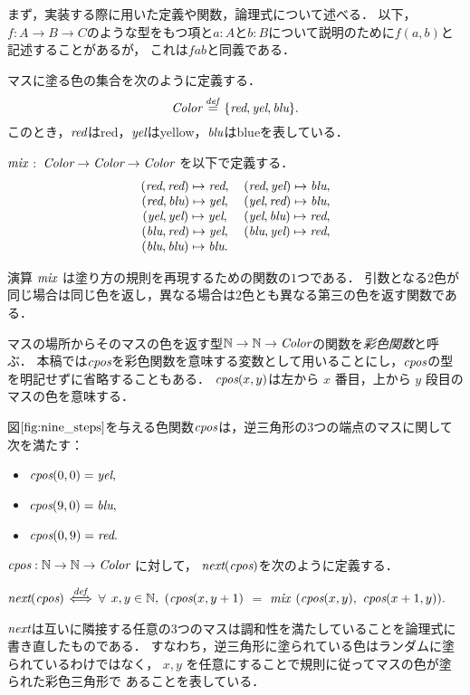 まず，実装する際に用いた定義や関数，論理式について述べる．
以下，$f:A\to B\to C$のような型をもつ項と$a:A$と$b:B$について説明のために$f(a,b)$と記述することがあるが，
これは$f a b$と同義である．
\begin{dfn}[$\Color$]\rm
  マスに塗る色の集合を次のように定義する．
  \[
  \textit{Color} \overset{{\it def}}{=} \{\textit{red}, \textit{yel}, \textit{blu}\}.
  \]
  このとき，$\textit{red}$は{\rm{red}}，$\textit{yel}$は{\rm{yellow}}，$\textit{blu}$は{\rm{blue}}を表している．
\end{dfn}
\begin{dfn}[$\mix$]\rm
  $\mix$ $:$ $\textit{Color} \to \textit{Color} \to \textit{Color}$ を以下で定義する．
  \[
  \begin{tabular}{cc}
    $(\red,\red) \Pto \red,$ & $(\red,\yel) \Pto \blu,$ \\
    $(\red,\blu) \Pto \yel,$ & $(\yel,\red) \Pto \blu,$ \\
    $(\yel,\yel) \Pto \yel,$ & $(\yel,\blu) \Pto \red,$ \\
    $(\blu,\red) \Pto \yel,$ & $(\blu,\yel) \Pto \red,$ \\
    $(\blu,\blu) \Pto \blu.$ \\
  \end{tabular}
  \]
\end{dfn}
演算 $\mix$ は塗り方の規則を再現するための関数の$1$つである．
引数となる$2$色が同じ場合は同じ色を返し，異なる場合は$2$色とも異なる第三の色を返す関数である．
\begin{dfn}[彩色関数]\rm
  マスの場所からそのマスの色を返す型$\mathbb{N} \to \mathbb{N} \to \textit{Color}$の関数を{\em 彩色関数}と呼ぶ．
  本稿では$\textit{cpos}$を彩色関数を意味する変数として用いることにし，$\textit{cpos}$の型を明記せずに省略することもある．
  $\textit{cpos}(x,y)$は左から $x$ 番目，上から $y$ 段目のマスの色を意味する．
\end{dfn}
\begin{exm}
  図$\ref{fig:nine_steps}$を与える色関数$\textit{cpos}$は，逆三角形の$3$つの端点のマスに関して
  次を満たす：
  \begin{itemize}
    \item $\textit{cpos}(0,0) = \textit{yel},$
    \item $\textit{cpos}(9,0) = \textit{blu},$
    \item $\textit{cpos}(0,9) = \textit{red}.$
  \end{itemize}
\end{exm}
\begin{dfn}[$\next$]\rm
  $\textit{cpos} : \mathbb{N} \to \mathbb{N} \to \textit{Color}$ に対して，
  $\textit{next}(\textit{cpos})$を次のように定義する．

  $\textit{next}(\textit{cpos})$ $\overset{{\it def}}{\Longleftrightarrow}$
  $\forall$ $x,y \in\mathbb{N},$
  $(\textit{cpos}(x,y+1)$ $=$ $\mix$ $(\textit{cpos}(x,y),$ $\textit{cpos}(x+1,y)).$
\end{dfn}
$\next$は互いに隣接する任意の$3$つのマスは調和性を満たしていることを論理式に書き直したものである．
すなわち，逆三角形に塗られている色はランダムに塗られているわけではなく，
$x,y$ を任意にすることで規則に従ってマスの色が塗られた彩色三角形で
あることを表している．

